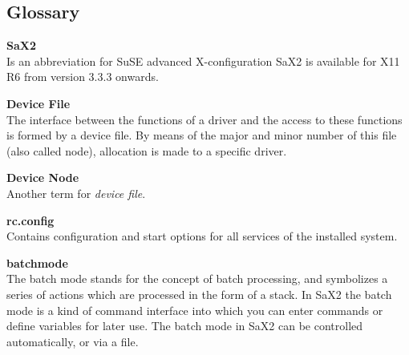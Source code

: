 \begin{twocolumn}
\setcounter{secnumdepth}{-1}
\chapter{Glossary}

\begin{description}

\begin{small}
\item {\textbf{SaX2}\\} {
  Is an abbreviation for SuSE advanced X-configuration
  SaX2 is available for X11 R6 from version 3.3.3 onwards.
}

\item {\textbf{Device File}\\} {
  The interface between the functions of a driver and the access to these
  \linebreak functions is formed by a device file. By means of the major and
  minor number of this file (also called node), allocation is made to a
  specific driver.  
}

\item {\textbf{Device Node}\\} {
  Another term for \textit{device file}.
}

\item {\textbf{rc.config}\\} {
  Contains configuration and start options for all services of the installed
  system. 
}

\item {\textbf{batchmode}\\} {
  The batch mode stands for the concept of batch processing, and symbolizes a
  series of actions which are processed in the form of a stack. In SaX2 the 
  batch mode is a kind of command interface into which you can enter commands
  or define variables for later use. The batch mode in SaX2 can be controlled
  automatically, or via a file.  
}

\end{small}
\end{description}
\end{twocolumn}


\onecolumn

